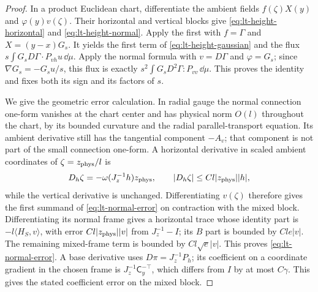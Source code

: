 \begin{proof}
In a product Euclidean chart, differentiate the ambient fields
$f(\zeta)X(y)$ and $\varphi(y)v(\zeta)$.  Their horizontal and vertical
blocks give \eqref{eq:lt-height-horizontal} and
\eqref{eq:lt-height-normal}.  Apply the first with
$f=\Gamma$ and $X=(y-x)G_s$.  It yields the first term of
\eqref{eq:lt-height-gaussian} and the flux
$s\int G_sD\Gamma\cdot P_{vh}u\,\dd\mu$.
Apply the normal formula with $v=D\Gamma$ and $\varphi=G_s$; since
$\nabla G_s=-G_su/s$, this flux is exactly
$s^2\int G_sD^2\Gamma:P_{vv}\,\dd\mu$.  This proves the identity and
fixes both its sign and its factors of $s$.

We give the geometric error calculation.  In radial gauge the normal
connection one-form vanishes at the chart center and has physical norm
$O(l)$ throughout the chart, by its bounded curvature and the radial
parallel-transport equation.  Its ambient derivative still has the
tangential component $-A_v$; that component is not part of the small
connection one-form.  A horizontal derivative in scaled ambient
coordinates of $\zeta=z_{\rm phys}/l$ is
\[
 D_h\zeta=-\omega(J_z^{-1}h)z_{\rm phys},
 \qquad |D_h\zeta|\le Cl|z_{\rm phys}||h|,
\]
while the vertical derivative is unchanged.  Differentiating $v(\zeta)$
therefore gives the first summand of \eqref{eq:lt-normal-error} on
contraction with the mixed block.  Differentiating its normal frame gives
a horizontal trace whose identity part is
$-l\langle H_S,v\rangle$, with error $Cl|z_{\rm phys}||v|$ from
$J_z^{-1}-I$; its $B$ part is bounded by $Cle|v|$.
The remaining mixed-frame term is bounded by $Cl\sqrt e|v|$.
This proves \eqref{eq:lt-normal-error}.  A base derivative uses
$D\pi=J_z^{-1}P_h$; its coefficient on a coordinate gradient in the chosen
frame is $J_z^{-1}\mathsf C_y^{-\top}$, which differs from $I$ by at most
$C\gamma$.  This gives the stated coefficient error on the mixed block.


\end{proof}
